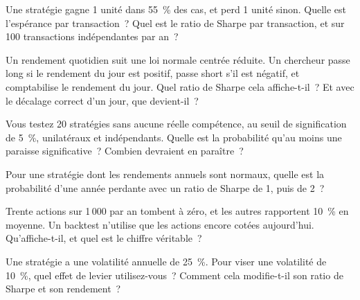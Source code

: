 \begin{question}\label{iq:iv2:research-and-strategy-cases:5}
Une stratégie gagne 1 unité dans 55~\% des cas, et perd 1 unité sinon. Quelle est l'espérance par transaction~? Quel est le ratio de Sharpe par transaction, et sur 100 transactions indépendantes par an~?
\end{question}

\begin{question}\label{iq:iv2:research-and-strategy-cases:6}
Un rendement quotidien suit une loi normale centrée réduite. Un chercheur passe long si le rendement du jour est positif, passe short s'il est négatif, et comptabilise le rendement du jour. Quel ratio de Sharpe cela affiche-t-il~? Et avec le décalage correct d'un jour, que devient-il~?
\end{question}

\begin{question}\label{iq:iv2:research-and-strategy-cases:7}
Vous testez 20 stratégies sans aucune réelle compétence, au seuil de signification de 5~\%, unilatéraux et indépendants. Quelle est la probabilité qu'au moins une paraisse significative~? Combien devraient en paraître~?
\end{question}

\begin{question}\label{iq:iv2:research-and-strategy-cases:8}
Pour une stratégie dont les rendements annuels sont normaux, quelle est la probabilité d'une année perdante avec un ratio de Sharpe de 1, puis de 2~?
\end{question}

\begin{question}\label{iq:iv2:research-and-strategy-cases:9}
Trente actions sur 1\,000 par an tombent à zéro, et les autres rapportent 10~\% en moyenne. Un backtest n'utilise que les actions encore cotées aujourd'hui. Qu'affiche-t-il, et quel est le chiffre véritable~?
\end{question}

\begin{question}\label{iq:iv2:research-and-strategy-cases:10}
Une stratégie a une volatilité annuelle de 25~\%. Pour viser une volatilité de 10~\%, quel effet de levier utilisez-vous~? Comment cela modifie-t-il son ratio de Sharpe et son rendement~?
\end{question}


